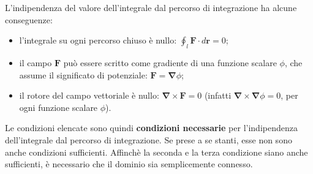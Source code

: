 \noindent	
L'indipendenza del valore dell'integrale dal percorso di integrazione ha alcune conseguenze:
\begin{itemize}
\item l'integrale su ogni percorso chiuso è nullo: $\oint_{l} \bm{F} \cdot d\bm{r} = 0$;
\item il campo $\bm{F}$ può essere scritto come gradiente di una funzione scalare $\phi$, che assume
      il significato di potenziale: $\bm{F} = \bm{\nabla}\phi$;
\item il rotore del campo vettoriale è nullo: $\bm{\nabla} \times \bm{F} = 0$ (infatti $\bm{\nabla} \times \bm{\nabla} \phi= 0$,
 per ogni funzione scalare $\phi$).
\end{itemize}
%
Le condizioni elencate sono quindi \textbf{condizioni necessarie} per l'indipendenza dell'integrale dal percorso di integrazione.
Se prese a se stanti, esse non sono anche condizioni sufficienti. Affinchè la seconda e la terza condizione siano
anche sufficienti, è necessario che il dominio sia semplicemente connesso.
